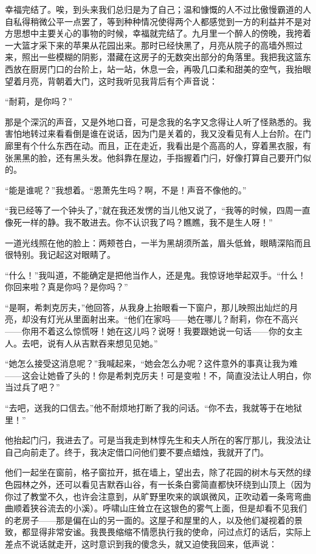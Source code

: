 \par 幸福完结了。唉，到头来我们总归是为了自己；温和慷慨的人不过比傲慢霸道的人自私得稍微公平一点罢了，等到种种情况使得两个人都感觉到一方的利益并不是对方思想中主要关心的事物的时候，幸福就完结了。九月里一个醉人的傍晚，我挎着一大篮才采下来的苹果从花园出来。那时已经快黑了，月亮从院子的高墙外照过来，照出一些模糊的阴影，潜藏在这房子的无数突出部分的角落里。我把我这篮东西放在厨房门口的台阶上，站一站，休息一会，再吸几口柔和甜美的空气，我抬眼望着月亮，背朝着大门，这时我听见我背后有个声音说：
\par “耐莉，是你吗？”
\par 那是个深沉的声音，又是外地口音，可是念我的名字又念得让人听了怪熟悉的。我害怕地转过来看看倒是谁在说话，因为门是关着的，我又没看见有人上台阶。在门廊里有个什么东西在动。而且，正在走近，我看出是个高高的人，穿着黑衣服，有张黑黑的脸，还有黑头发。他斜靠在屋边，手指握着门闩，好像打算自己要开门似的。
\par “能是谁呢？”我想着。“恩萧先生吗？啊，不是！声音不像他的。”
\par “我已经等了一个钟头了，”就在我还发愣的当儿他又说了，“我等的时候，四周一直像死一样的静。我不敢进去。你不认识我了吗？瞧瞧，我不是生人呀！”
\par 一道光线照在他的脸上：两颊苍白，一半为黑胡须所盖，眉头低耸，眼睛深陷而且很特别。我记起这对眼睛了。
\par “什么！”我叫道，不能确定是把他当作人，还是鬼。我惊讶地举起双手。“什么！你回来啦？真是你吗？是你吗？”
\par “是啊，希刺克厉夫，”他回答，从我身上抬眼看一下窗户，那儿映照出灿烂的月亮，却没有灯光从里面射出来。“他们在家吗——她在哪儿？耐莉，你在不高兴——你用不着这么惊慌呀！她在这儿吗？说呀！我要跟她说一句话——你的女主人。去吧，说有人从吉默吞来想见见她。”
\par “她怎么接受这消息呢？”我喊起来，“她会怎么办呢？这件意外的事真让我为难——这会让她昏了头的！你是希刺克厉夫！可是变啦！不，简直没法让人明白，你当过兵了吧？”
\par “去吧，送我的口信去。”他不耐烦地打断了我的问话。“你不去，我就等于在地狱里！”
\par 他抬起门闩，我进去了。可是当我走到林惇先生和夫人所在的客厅那儿，我没法让自己向前走了。终于，我决定借口问他们要不要点蜡烛，我就开了门。
\par 他们一起坐在窗前，格子窗拉开，抵在墙上，望出去，除了花园的树木与天然的绿色园林之外，还可以看见吉默吞山谷，有一长条白雾简直都快环绕到山顶上（因为你过了教堂不久，也许会注意到，从旷野里吹来的飒飒微风，正吹动着一条弯弯曲曲顺着狭谷流去的小溪）。呼啸山庄耸立在这银色的雾气上面，但是却看不见我们的老房子——那是偏在山的另一面的。这屋子和屋里的人，以及他们凝视着的景致，都显得非常安谧。我畏畏缩缩不情愿执行我的使命，问过点灯的话后，实际上差点不说话就走开，这时意识到我的傻念头，就又迫使我回来，低声说：
